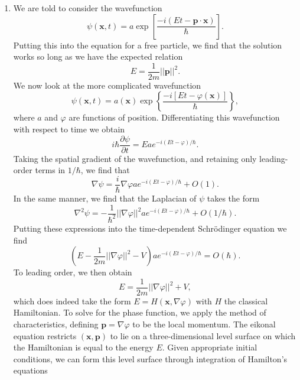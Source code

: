 \documentclass[a4paper,10pt]{paper}
\begin{document}
\begin{enumerate}
\item We are told to consider the wavefunction
\begin{equation*}
    \psi(\mathbf{x},t)=a\exp\left[\frac{-i(E t-\mathbf{p}\cdot\mathbf{x})}{\hbar}\right].
\end{equation*}
Putting this into the equation for a free particle, we find that the solution works so long as we have the expected relation
\begin{equation*}
    E=\frac{1}{2m}||\mathbf{p}||^{2}.
\end{equation*}
We now look at the more complicated wavefunction
\begin{equation*}
    \psi(\mathbf{x},t)=a(\mathbf{x})\exp\left\{\frac{-i[E t-\varphi(\mathbf{x})]}{\hbar}\right\},
\end{equation*}
where $a$ and $\varphi$ are functions of position. Differentiating this wavefunction with respect to time we obtain
\begin{equation*}
    i\hbar\frac{\partial\psi}{\partial t}=E a e^{-i(Et-\varphi)/\hbar}.
\end{equation*}
Taking the spatial gradient of the wavefunction, and retaining only leading-order terms in $1/\hbar$, we find that
\begin{equation*}
    \nabla\psi=\frac{i}{\hbar}\nabla\varphi a e^{-i(Et-\varphi)/\hbar}+O(1).
\end{equation*}
In the same manner, we find that the Laplacian of $\psi$ takes the form
\begin{equation*}
    \nabla^{2}\psi=-\frac{1}{\hbar^{2}}||\nabla\varphi||^{2}a e^{-i(Et-\varphi)/\hbar}+O(1/\hbar).
\end{equation*}
Putting these expressions into the time-dependent Schrödinger equation we find
\begin{equation*}
    \left(E-\frac{1}{2m}||\nabla\varphi||^{2}-V\right)a e^{-i(Et-\varphi)/\hbar}=O(\hbar).
\end{equation*}
To leading order, we then obtain
\begin{equation*}
    E=\frac{1}{2m}||\nabla\varphi||^{2}+V,
\end{equation*}
which does indeed take the form $E=H(\mathbf{x},\nabla\varphi)$ with $H$ the classical Hamiltonian. To solve for the phase function, we apply the method of characteristics, defining $\mathbf{p}=\nabla\varphi$ to be the local momentum. The eikonal equation restricts $(\mathbf{x}, \mathbf{p})$ to lie on a three-dimensional level surface on which the Hamiltonian is equal to the energy $E$. Given appropriate initial conditions, we can form this level surface through integration of Hamilton's equations

\end{enumerate}
\end{document}
